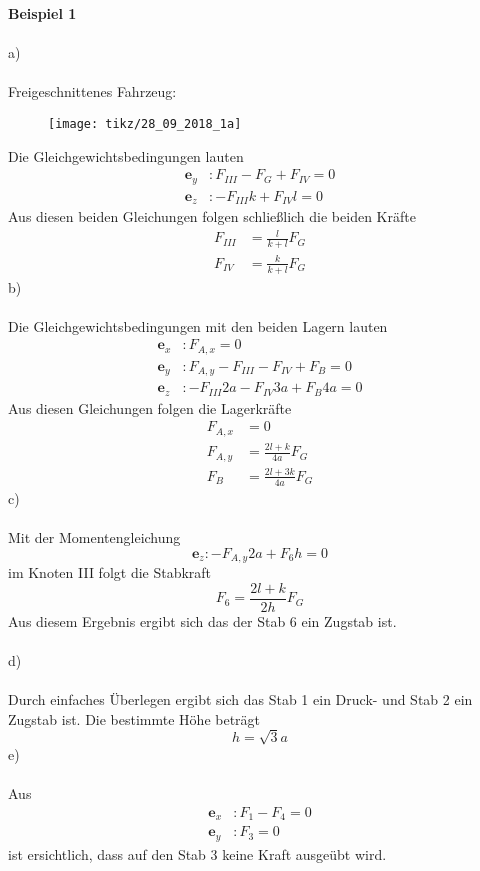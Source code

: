 \textbf{Beispiel 1}\\ \\
a)\\ \\
Freigeschnittenes Fahrzeug:
\begin{figure}[h]
	\centering
	\texttt{[image: tikz/28\_09\_2018\_1a]}
\end{figure}
\newline
Die Gleichgewichtsbedingungen lauten
\begin{align*}
	\textbf{e}_y &: F_{III} - F_G + F_{IV} = 0 \\
	\textbf{e}_z &: -F_{III}k + F_{IV}l = 0
\end{align*}
Aus diesen beiden Gleichungen folgen schließlich die beiden Kräfte 
\begin{align*}
	F_{III} &= \frac{l}{k + l}F_G \\
	F_{IV} &= \frac{k}{k + l}F_G
\end{align*}
b) \\ \\
Die Gleichgewichtsbedingungen mit den beiden Lagern lauten
\begin{align*}
	\textbf{e}_x &: F_{A,x} = 0\\
	\textbf{e}_y &: F_{A,y} - F_{III} - F_{IV} + F_B = 0\\
	\textbf{e}_z &: -F_{III}2a  - F_{IV}3a + F_B4a = 0
\end{align*}
Aus diesen Gleichungen folgen die Lagerkräfte
\begin{align*}
	F_{A,x} &= 0 \\
	F_{A,y} &= \frac{2l + k}{4a}F_G \\
	F_B &= \frac{2l + 3k}{4a}F_G
\end{align*}
c)\\ \\
Mit der Momentengleichung
\[
	\textbf{e}_z : -F_{A,y}2a + F_6h = 0 
\]
im Knoten III folgt die Stabkraft
\[
	F_6 = \frac{2l + k}{2h}F_G
\]
Aus diesem Ergebnis ergibt sich das der Stab 6 ein Zugstab ist. \\ \\
d)\\ \\
Durch einfaches Überlegen ergibt sich das Stab 1 ein Druck- und Stab 2 ein Zugstab ist. Die bestimmte Höhe beträgt
\[
	h = \sqrt{3}a
\]
e) \\ \\
Aus 
\begin{align*}
	\textbf{e}_x &: F_1 - F_4 = 0\\
	\textbf{e}_y &: F_3 = 0
\end{align*}
ist ersichtlich, dass auf den Stab 3 keine Kraft ausgeübt wird. \\ \\